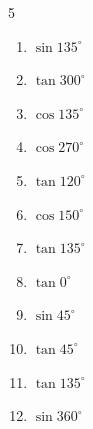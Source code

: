 \begin{multicols}{5}
\begin{enumerate}
        \phantom{$\displaystyle =0$}

  \item $\displaystyle \sin{135^\circ}$


  \item $\displaystyle \tan{300^\circ}$


  \item $\displaystyle \cos{135^\circ}$


  \item $\displaystyle \cos{270^\circ}$

        \phantom{$\displaystyle =0$}

  \item $\displaystyle \tan{120^\circ}$


  \item $\displaystyle \cos{150^\circ}$


\columnbreak %

  \item $\displaystyle \tan{135^\circ}$

        \phantom{$\displaystyle =-1$}

  \item $\displaystyle \tan{0^\circ}$

        \phantom{$\displaystyle =0$}

  \item $\displaystyle \sin{45^\circ}$


  \item $\displaystyle \tan{45^\circ}$

        \phantom{$\displaystyle =1$}

  \item $\displaystyle \tan{135^\circ}$

        \phantom{$\displaystyle =-1$}

  \item $\displaystyle \sin{360^\circ}$

        \phantom{$\displaystyle =0$}


\end{enumerate}
\end{multicols}
